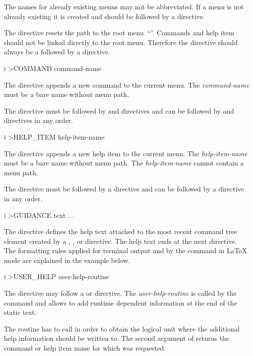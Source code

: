 The names for already existing menus may not be abbreviated.
If a menu is not already existing it is created and should be followed
by a  directive.

The  directive resets the path to the root
menu~``\Lit{/}''. 
Commands and help item should not be linked directly to the root menu.
Therefore the  directive should always be a followed by a
 directive. 


\begin{Gray}{i}
>COMMAND  command-name
\end{Gray}
The  directive appends a new command to the
current menu.
The \textsl{command-name} must be a bare name without menu path.

The  directive must be followed by  and
 directives and can be followed by  and
 directives in any order.


\begin{Gray}{i}
>HELP_ITEM  help-item-name
\end{Gray}
The  directive appends a new help item to the
current menu.
The \textsl{help-item-name} must be a bare name without menu path.
The \textsl{help-item-name} cannot contain a menu path.

The  directive must be followed by a 
directive and can be followed by a  directive in any order.

\condbreak{2cm}
\begin{Gray}{i}
>GUIDANCE
   text
   ...
\end{Gray}
The  directive defines the help text attached to the
most recent command tree element created by a ,
, or  directive.
The help text ends at the next \CDF{} directive.
The formatting rules applied for terminal output and by the 
 command in \LaTeX{} mode are explained in the example below.


\begin{Gray}{i}
>USER_HELP  user-help-routine
\end{Gray}
The  directive may follow a  or
 directive.
The \textsl{user-help-routine} is called by the  command and
allows to add runtime dependent information at the end of the static
 text. 

The routine has to call  in order to obtain the 
logical unit where the additional help information should be written to.
The second argument of  returns the command or help item
name for which  was requested.

